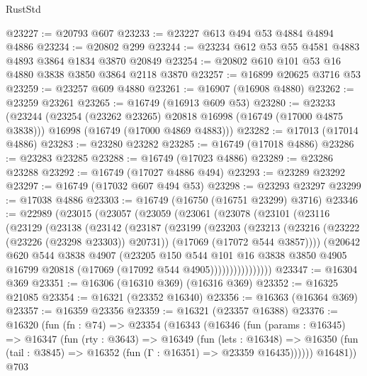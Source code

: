 \begin{lexlean}{RustStd}
\begin{coremodule}
@23227 := @20793 @607
@23233 := @23227 @613 @494 @53 @4884 @4894 @4886
@23234 := @20802 @299
@23244 := @23234 @612 @53 @55 @4581 @4883 @4893 @3864 @1834 @3870 @20849
@23254 := @20802 @610 @101 @53 @16 @4880 @3838 @3850 @3864 @2118 @3870
@23257 := @16899 @20625 @3716 @53
@23259 := @23257 @609 @4880
@23261 := @16907 (@16908 @4880)
@23262 := @23259 @23261
@23265 := @16749 (@16913 @609 @53)
@23280 := @23233
    (@23244
      (@23254 (@23262 @23265) @20818 @16998 (@16749 (@17000 @4875 @3838)))
      @16998
      (@16749 (@17000 @4869 @4883)))
@23282 := @17013 (@17014 @4886)
@23283 := @23280 @23282
@23285 := @16749 (@17018 @4886)
@23286 := @23283 @23285
@23288 := @16749 (@17023 @4886)
@23289 := @23286 @23288
@23292 := @16749 (@17027 @4886 @494)
@23293 := @23289 @23292
@23297 := @16749 (@17032 @607 @494 @53)
@23298 := @23293 @23297
@23299 := @17038 @4886
@23303 := @16749 (@16750 (@16751 @23299) @3716)
@23346 := @22989
    (@23015
      (@23057
        (@23059
          (@23061
            (@23078
              (@23101
                (@23116
                  (@23129
                    (@23138
                      (@23142
                        (@23187
                          (@23199
                            (@23203
                              (@23213
                                (@23216 (@23222 (@23226 (@23298 @23303)) @20731))
                                (@17069 (@17072 @544 @3857))))
                            (@20642
                              @620
                              @544
                              @3838
                              @4907
                              (@23205
                                @150
                                @544
                                @101
                                @16
                                @3838
                                @3850
                                @4905
                                @16799
                                @20818
                                (@17069 (@17092 @544 @4905))))))))))))))))
@23347 := @16304 @369
@23351 := @16306 (@16310 @369) (@16316 @369)
@23352 := @16325 @21085
@23354 := @16321 (@23352 @16340)
@23356 := @16363 (@16364 @369)
@23357 := @16359 @23356
@23359 := @16321 (@23357 @16388)
@23376 := @16320
    (fun (fn : @74) =>
    @23354
      (@16343
        (@16346
          (fun (params : @16345) =>
          @16347
            (fun (rty : @3643) =>
            @16349
              (fun (lets : @16348) =>
              @16350 (fun (tail : @3845) => @16352 (fun (Γ : @16351) => @23359 @16435))))))
        @16481))
    @703

\end{coremodule}
\end{lexlean}
